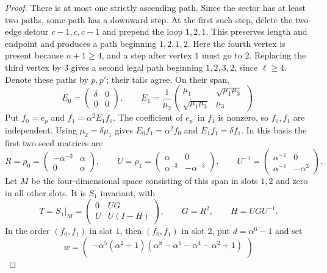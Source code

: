 \documentclass[11pt,a4paper]{article}
\begin{document}
\begin{proof}
There is at most one strictly ascending path. Since the sector has
at least two paths, some path has a downward step. At the first such
step, delete the two-edge detour $c-1,c,c-1$ and prepend the loop
$1,2,1$. This preserves length and endpoint and produces a path
beginning $1,2,1,2$. Here the fourth vertex is present because
$n+1\ge4$, and a step after vertex $1$ must go to $2$.
Replacing the third vertex by $3$ gives a second legal path beginning
$1,2,3,2$, since $\ell\ge4$. Denote these paths by $p,p'$;
their tails agree. On their span,
\[
 E_0=\begin{pmatrix}\delta&0\\0&0\end{pmatrix},\qquad
 E_1=\frac1{\mu_2}
 \begin{pmatrix}\mu_1&\sqrt{\mu_1\mu_3}\\
 \sqrt{\mu_1\mu_3}&\mu_3\end{pmatrix}.
\]
Put $f_0=e_p$ and $f_1=\alpha^2E_1f_0$.
The coefficient of $e_{p'}$ in $f_1$ is nonzero, so $f_0,f_1$
are independent. Using $\mu_2=\delta\mu_1$ gives
$E_0f_1=\alpha^2f_0$ and $E_1f_1=\delta f_1$.
In this basis the first two seed matrices are
\begin{equation}\label{eq:RU}
 R=\rho_0=\begin{pmatrix}-\alpha^{-3}&\alpha\\0&\alpha\end{pmatrix},
 \qquad U=\rho_1=\begin{pmatrix}\alpha&0\\\alpha^{-3}&-\alpha^{-3}\end{pmatrix},
 \qquad U^{-1}=\begin{pmatrix}\alpha^{-1}&0\\\alpha^{-1}&-\alpha^3\end{pmatrix}.
\end{equation}
Let $M$ be the four-dimensional space consisting of this span in
slots $1,2$ and zero in all other slots. It is $S_1$ invariant, with
\begin{equation}\label{eq:T}
 T=S_1|_M=\begin{pmatrix}0&UG\\U&U(I-H)\end{pmatrix},
 \qquad G=R^2,\qquad H=UGU^{-1}.
\end{equation}
In the order $(f_0,f_1)$ in slot $1$, then $(f_0,f_1)$ in slot $2$,
put $d=\alpha^6-1$ and set
\begin{equation}\label{eq:wv}
 w=\begin{pmatrix}
 -\alpha^5(\alpha^2+1)(\alpha^8-\alpha^6-\alpha^4-\alpha^2+1)\\

\end{pmatrix}
\end{equation}
\end{proof}
\end{document}
